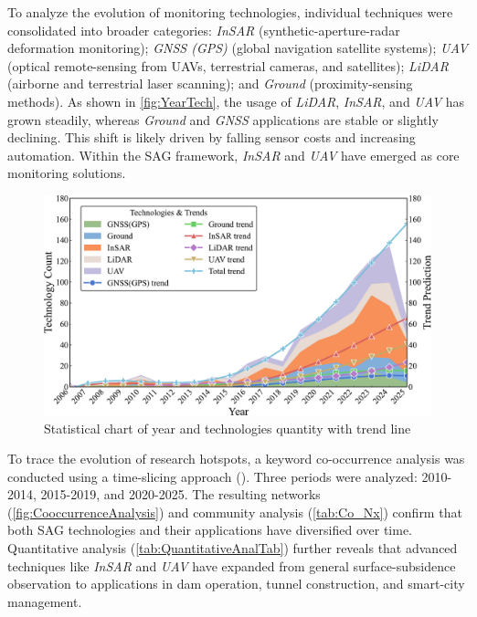\documentclass[preprint,11pt,authoryear,3p]{elsarticle}
\begin{document}
To analyze the evolution of monitoring technologies, individual techniques were consolidated into broader categories: \emph{InSAR} (synthetic-aperture-radar deformation monitoring); \emph{GNSS (GPS)} (global navigation satellite systems); \emph{UAV} (optical remote-sensing from UAVs, terrestrial cameras, and satellites); \emph{LiDAR} (airborne and terrestrial laser scanning); and \emph{Ground} (proximity-sensing methods). As shown in \autoref{fig:YearTech}, the usage of \emph{LiDAR}, \emph{InSAR}, and \emph{UAV} has grown steadily, whereas \emph{Ground} and \emph{GNSS} applications are stable or slightly declining. This shift is likely driven by falling sensor costs and increasing automation. Within the SAG framework, \emph{InSAR} and \emph{UAV} have emerged as core monitoring solutions.

\begin{figure}[htbp]
    \centering
    \includegraphics[width=\textwidth]{./imgs/Year_Tech.pdf}
    \caption{Statistical chart of year and technologies quantity with trend line}
    \label{fig:YearTech}
\end{figure}

To trace the evolution of research hotspots, a keyword co-occurrence analysis was conducted using a time-slicing approach (\citep{Lee01042010}). Three periods were analyzed: 2010-2014, 2015-2019, and 2020-2025. The resulting networks (\autoref{fig:CooccurrenceAnalysis}) and community analysis (\autoref{tab:Co_Nx}) confirm that both SAG technologies and their applications have diversified over time. Quantitative analysis (\autoref{tab:QuantitativeAnalTab}) further reveals that advanced techniques like \emph{InSAR} and \emph{UAV} have expanded from general surface-subsidence observation to applications in dam operation, tunnel construction, and smart-city management.
\end{document}
